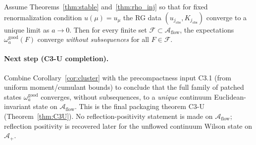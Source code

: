 \begin{corollary}\label{cor:cluster}
Assume Theorems~\ref{thm:stable} and~\ref{thm:rho_inj} so that for fixed renormalization condition $u(\mu)=u_\mu$ the RG data
$(u_{j_{\mathrm{obs}}},K_{j_{\mathrm{obs}}})$ converge to a unique limit as $a\to0$.
Then for every finite set $\mathcal F\subset\mathcal A_{\mathrm{flow}}$, the expectations $\omega_a^{\mathrm{good}}(F)$ converge \emph{without subsequences}
for all $F\in\mathcal F$.
\end{corollary}

\paragraph{Next step (C3-U completion).}
Combine Corollary~\ref{cor:cluster} with the precompactness input C3.1 (from uniform moment/cumulant bounds) to conclude that the full family of patched states
$\omega_a^{\mathrm{good}}$ converges, without subsequences, to a \emph{unique} continuum Euclidean-invariant state on $\mathcal A_{\mathrm{flow}}$.
This is the final packaging theorem C3-U (Theorem~\ref{thm:C3U}).
No reflection-positivity statement is made on $\mathcal A_{\mathrm{flow}}$; reflection positivity is recovered later for the unflowed continuum Wilson state on $\mathcal A_+$.
